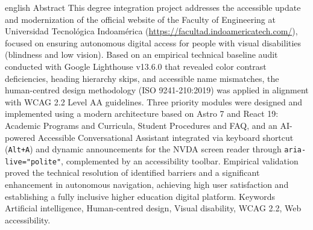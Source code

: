 \UTIResumenPagina
  {english}
  {Abstract}
  {This degree integration project addresses the accessible update and modernization of the official website of the Faculty of Engineering at Universidad Tecnológica Indoamérica (\url{https://facultad.indoamericatech.com/}), focused on ensuring autonomous digital access for people with visual disabilities (blindness and low vision). Based on an empirical technical baseline audit conducted with Google Lighthouse v13.6.0 that revealed color contrast deficiencies, heading hierarchy skips, and accessible name mismatches, the human-centred design methodology (ISO 9241-210:2019) was applied in alignment with WCAG 2.2 Level AA guidelines. Three priority modules were designed and implemented using a modern architecture based on Astro 7 and React 19: Academic Programs and Curricula, Student Procedures and FAQ, and an AI-powered Accessible Conversational Assistant integrated via keyboard shortcut (\texttt{Alt+A}) and dynamic announcements for the NVDA screen reader through \texttt{aria-live="polite"}, complemented by an accessibility toolbar. Empirical validation proved the technical resolution of identified barriers and a significant enhancement in autonomous navigation, achieving high user satisfaction and establishing a fully inclusive higher education digital platform.}
  {Keywords}
  {Artificial intelligence, Human-centred design, Visual disability, WCAG 2.2, Web accessibility.}
